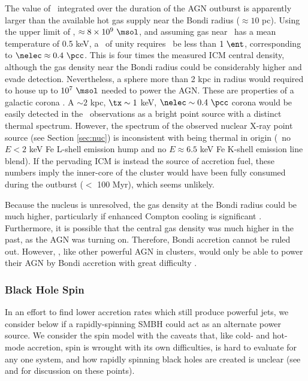 \documentclass[apjpt4]{aastex}
\begin{document}
The value of \dmb\ integrated over the duration of the AGN outburst is
apparently larger than the available hot gas supply near the Bondi
radius ($\approx 10$ pc). Using the upper limit of \mbh, $\approx 8
\times 10^9 ~\msol$, and assuming gas near \rbon\ has a mean
temperature of 0.5 keV, a \dmb\ of unity requires \kbon\ be less than
$1 ~\ent$, corresponding to $\nelec \approx 0.4 ~\pcc$. This is four
times the measured ICM central density, although the gas density near
the Bondi radius could be considerably higher and evade detection.
Nevertheless, a sphere more than 2 kpc in radius would required to
house up to $10^7 ~\msol$ needed to power the AGN. These are
properties of a galactic corona \citep{coronae}. A $\sim 2$ kpc, $\tx
\sim 1$ keV, $\nelec \sim 0.4 ~\pcc$ corona would be easily detected
in the \cxo\ observations as a bright point source with a distinct
thermal spectrum. However, the spectrum of the observed nuclear X-ray
point source (see Section \ref{sec:nuc}) is inconsistent with being
thermal in origin (\ie\ no $E < 2$ keV Fe L-shell emission hump and no
$E \approx 6.5$ keV Fe K-shell emission line blend). If the pervading
ICM is instead the source of accretion fuel, these numbers imply the
inner-core of the cluster would have been fully consumed during the
outburst ($<$ 100 Myr), which seems unlikely.

Because the nucleus is unresolved, the gas density at the Bondi radius
could be much higher, particularly if enhanced Compton cooling is
significant \citep[\eg][]{2010MNRAS.402.1561R}. Furthermore, it is
possible that the central gas density was much higher in the past, as
the AGN was turning on. Therefore, Bondi accretion cannot be ruled
out. However, \rbs, like other powerful AGN in clusters, would only be
able to power their AGN by Bondi accretion with great difficulty
\citep{rafferty06, minaspin}.

\subsubsection{Black Hole Spin}

In an effort to find lower accretion rates which still produce
powerful jets, we consider below if a rapidly-spinning SMBH could act
as an alternate power source. We consider the spin model with the
caveats that, like cold- and hot-mode accretion, spin is wrought with
its own difficulties, is hard to evaluate for any one system, and how
rapidly spinning black holes are created is unclear (see
\citealt{msspin} and \citealt{minaspin} for discussion on these
points).
\end{document}

